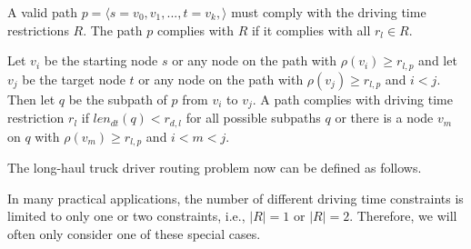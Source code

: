 \begin{definition}
	A valid path $p = \langle s=v_0,v_1,...,t=v_k, \rangle$ must comply with the driving time restrictions $R$. The path $p$ complies with $R$ if it complies with all $r_l \in R$.

	Let $v_i$ be the starting node $s$ or any node on the path with $\rho(v_i) \ge r_{l,p}$ and let $v_j$ be the target node $t$ or any node on the path with $\rho(v_j) \ge r_{l,p}$ and $i < j$. Then let $q$ be the subpath of $p$ from $v_i$ to $v_j$. A path complies with driving time restriction $r_l$ if $len_{dt}(q) < r_{d,l}$ for all possible subpaths $q$ or there is a node $v_m$ on $q$ with $\rho(v_m) \ge r_{l,p}$ and $i < m < j$.
\end{definition}

The long-haul truck driver routing problem now can be defined as follows.

\begin{namedproblem}
\end{namedproblem}

In many practical applications, the number of different driving time constraints is limited to only one or two constraints, i.e., $|R| = 1$ or  $|R| = 2$. Therefore, we will often only consider one of these special cases.